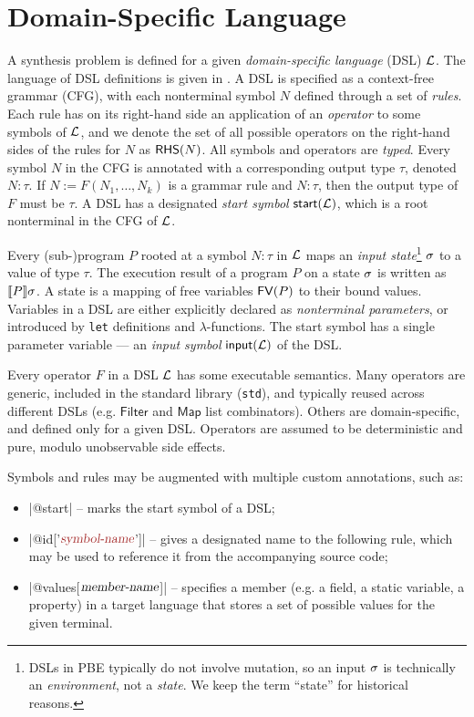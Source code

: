 \section{Domain-Specific Language}



A synthesis problem is defined for a given \emph{domain-specific language} (DSL) $\mathcal{L}$.
The language of DSL definitions is given in .
A DSL is specified as a context-free grammar (CFG), with each nonterminal symbol $N$ defined through a set of
\emph{rules}.
Each rule has on its right-hand side an application of an \emph{operator} to some symbols of $\mathcal{L}$, and we denote the
set of all possible operators on the right-hand sides of the rules for $N$ as $\mathsf{RHS}(N)$.
All symbols and operators are \emph{typed}.
Every symbol $N$ in the CFG is annotated with a corresponding output type $\tau$, denoted $N\colon \tau$.
If $N := F(N_1, \dots, N_k)$ is a grammar rule and $N\colon \tau$, then the output type of $F$ must be $\tau$.
A DSL has a designated \emph{start symbol} $\mathsf{start}(\mathcal{L})$, which is a root nonterminal in the CFG of $\mathcal{L}$.

Every (sub-)program $P$ rooted at a symbol $N\colon \tau$ in $\mathcal{L}$ maps an \emph{input state}\footnote{DSLs in PBE
    typically do not involve mutation, so an input $\sigma$ is technically an \emph{environment}, not a \emph{state}.
    We keep the term ``state'' for historical reasons.} $\sigma$ to a value of type $\tau$.
The execution result of a program $P$ on a state $\sigma$ is written as $\llbracket P \rrbracket{\ensuremath{\sigma}}$.
A state is a mapping of free variables $\mathsf{FV}(P)$ to their bound values.
Variables in a DSL are either explicitly declared as \emph{nonterminal parameters}, or introduced by \texttt{let}
definitions and $\lambda$-functions.
The start symbol has a single parameter variable --- an \emph{input symbol} $\mathsf{input}(\mathcal{L})$ of the DSL.

Every operator $F$ in a DSL $\mathcal{L}$ has some executable semantics.
Many operators are generic, included in the standard library (\texttt{std}), and typically reused across different DSLs
(e.g. $\mathsf{Filter}$ and $\mathsf{Map}$ list combinators).
Others are domain-specific, and defined only for a given DSL.
Operators are assumed to be deterministic and pure, modulo unobservable side effects.

Symbols and rules may be augmented with multiple custom annotations, such as:
\begin{itemize}[nosep]
    \item \dslinline|@start| -- marks the start symbol of a DSL;
    \item \dslinline|@id['$\text{\rmfamily\slshape\color{Brown} symbol-name}$']| -- gives a designated name to the
        following rule, which may be used to reference it from the accompanying source code;
    \item \dslinline|@values[$\text{\rmfamily\slshape member-name}$]| -- specifies a member (e.g. a field, a static
        variable, a property) in a target language that stores a set of possible values for the given terminal.
\end{itemize}

